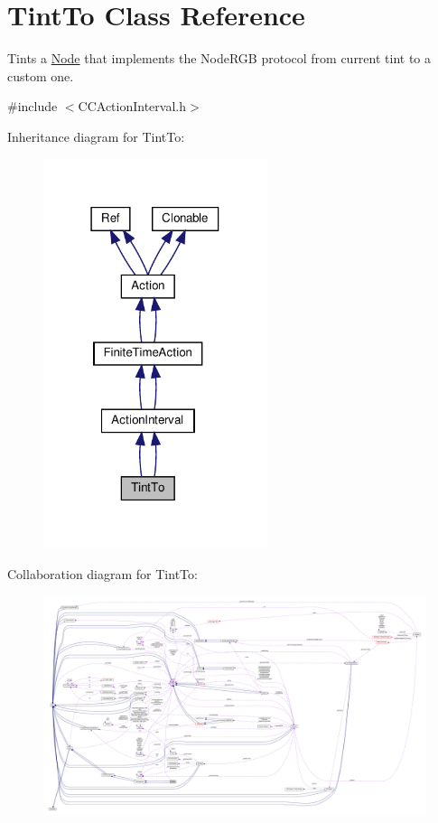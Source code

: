 \hypertarget{classTintTo}{}\section{Tint\+To Class Reference}
\label{classTintTo}


Tints a \hyperlink{classNode}{Node} that implements the Node\+R\+GB protocol from current tint to a custom one.  




{\ttfamily \#include $<$C\+C\+Action\+Interval.\+h$>$}



Inheritance diagram for Tint\+To\+:
\nopagebreak
\begin{figure}[H]
\begin{center}
\leavevmode
\includegraphics[width=186pt]{classTintTo__inherit__graph}
\end{center}
\end{figure}


Collaboration diagram for Tint\+To\+:
\nopagebreak
\begin{figure}[H]
\begin{center}
\leavevmode
\includegraphics[width=350pt]{classTintTo__coll__graph}
\end{center}
\end{figure}
